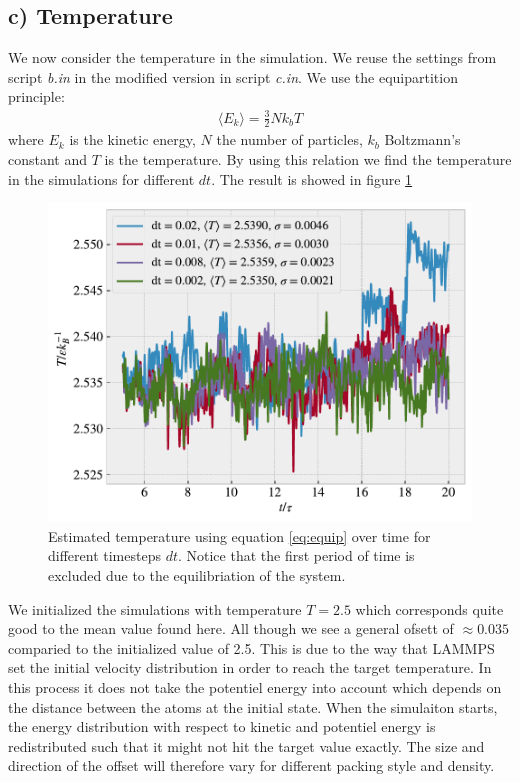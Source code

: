\documentclass[reprint, amsmath, amssymb, aps]{revtex4-2}
\begin{document}
\subsection*{c) Temperature}
We now consider the temperature in the simulation. We reuse the settings from script \textit{b.in} in the modified version in script \textit{c.in}. We use the equipartition principle:
\begin{align}
  \langle E_k \rangle = \frac{3}{2}Nk_bT
  \label{eq:equip}
\end{align}
where $E_k$ is the kinetic energy, $N$ the number of particles, $k_b$ Boltzmann's constant and $T$ is the temperature. By using this relation we find the temperature in the simulations for different $dt$. The result is showed in figure \ref{fig:temp}
\begin{figure}[H]
  \includegraphics[width=\linewidth]{figures/temp.pdf}
  \caption{Estimated temperature using equation \ref{eq:equip} over time for different timesteps $dt$. Notice that the first period of time is excluded due to the equilibriation of the system.}
  \label{fig:temp}
\end{figure}
We initialized the simulations with temperature $T = 2.5$ which corresponds quite good to the mean value found here. All though we see a general ofsett of $\approx 0.035$ comparied to the initialized value of 2.5. This is due to the way that LAMMPS set the initial velocity distribution in order to reach the target temperature. In this process it does not take the potentiel energy into account which depends on the distance between the atoms at the initial state. When the simulaiton starts, the energy distribution with respect to kinetic and potentiel energy is redistributed such that it might not hit the target value exactly. The size and direction of the offset will therefore vary for different packing style and density. \par
\end{document}
